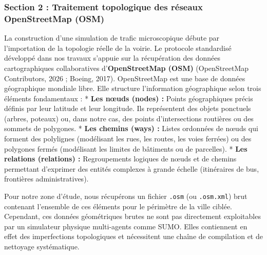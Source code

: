 \documentclass[10pt, a4paper]{article}
\begin{document}
\subsubsection{Section 2 : Traitement topologique des réseaux
OpenStreetMap
(OSM)}\label{section-2-traitement-topologique-des-ruxe9seaux-openstreetmap-osm}

La construction d'une simulation de trafic microscopique débute par
l'importation de la topologie réelle de la voirie. Le protocole
standardisé développé dans nos travaux s'appuie sur la récupération des
données cartographiques collaboratives d'\textbf{OpenStreetMap (OSM)}
(OpenStreetMap Contributors, 2026 ; Boeing, 2017). OpenStreetMap est une
base de données géographique mondiale libre. Elle structure
l'information géographique selon trois éléments fondamentaux : *
\textbf{Les nœuds (nodes) :} Points géographiques précis définis par
leur latitude et leur longitude. Ils représentent des objets ponctuels
(arbres, poteaux) ou, dans notre cas, des points d'intersections
routières ou des sommets de polygones. * \textbf{Les chemins (ways) :}
Listes ordonnées de nœuds qui forment des polylignes (modélisant les
rues, les routes, les voies ferrées) ou des polygones fermés (modélisant
les limites de bâtiments ou de parcelles). * \textbf{Les relations
(relations) :} Regroupements logiques de nœuds et de chemins permettant
d'exprimer des entités complexes à grande échelle (itinéraires de bus,
frontières administratives).

Pour notre zone d'étude, nous récupérons un fichier \texttt{.osm} (ou
\texttt{.osm.xml}) brut contenant l'ensemble de ces éléments pour le
périmètre de la ville ciblée. Cependant, ces données géométriques brutes
ne sont pas directement exploitables par un simulateur physique
multi-agents comme SUMO. Elles contiennent en effet des imperfections
topologiques et nécessitent une chaîne de compilation et de nettoyage
systématique.
\end{document}
